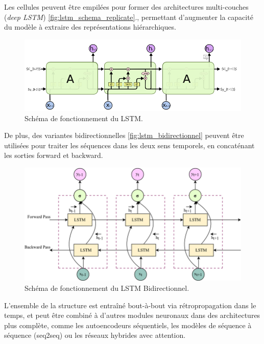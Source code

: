 Les cellules peuvent être empilées pour former des architectures multi-couches (\textit{deep LSTM}) \autoref{fig:lstm_schema_replicate}., permettant d’augmenter la capacité du modèle à extraire des représentations hiérarchiques. 

\begin{figure}[H]
    \centering
    \includegraphics[width=1\linewidth]{images/lstm_relicates_cells.png}
    \caption{Schéma de fonctionnement du LSTM.}
    \label{fig:lstm_schema_replicate}
\end{figure}

De plus, des variantes bidirectionnelles \autoref{fig:lstm_bidirectionnel} peuvent être utilisées pour traiter les séquences dans les deux sens temporels, en concaténant les sorties forward et backward. 

\begin{figure}[H]
    \centering
    \includegraphics[width=1\linewidth]{images/lstm_bidirectionnel.png}
    \caption{Schéma de fonctionnement du LSTM Bidirectionnel.}
    \label{fig:lstm_bidirectionnel}
\end{figure}

L’ensemble de la structure est entraîné bout-à-bout via rétropropagation dans le temps, et peut être combiné à d’autres modules neuronaux dans des architectures plus complète, comme les autoencodeurs séquentiels, les modèles de séquence à séquence (seq2seq) ou les réseaux hybrides avec attention.\\


